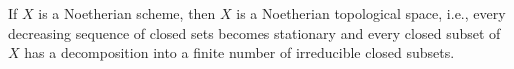 If $X$ is a Noetherian scheme, then $X$ is a Noetherian topological space, i.e.,
every decreasing sequence of closed sets becomes stationary and every closed subset
of $X$ has a decomposition into a finite number of irreducible closed subsets.
